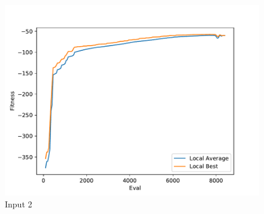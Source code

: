 \documentclass{standalone}
\begin{document}
\begin{figure}[!htb]
	\caption{Input 2}
	\label{fig:graph_2064}
	\includegraphics[width=\textwidth]{../graphs/graphs/2064.pdf}
\end{figure}
\end{document}
